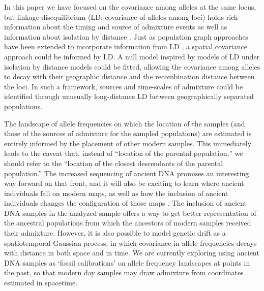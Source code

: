 \documentclass[12pt]{article}
\begin{document}
In this paper we have focused on the covariance among alleles at the same locus, 
but linkage disequilibrium (LD; covariance of alleles among loci) 
holds rich information about the timing and source of admixture events \citep[e.g.][]{chakraborty_admixture_1988,moorjani_india_2013, Hellenthal,gravel_population_2012} 
as well as information about isolation by distance \citep{ralph2013geography}.
Just as population graph approaches have been extended to incorporate information from LD \citep{Loh:13}, 
a spatial covariance approach could be informed by LD. 
A null model inspired by models of LD under isolation by distance models \citep{Arkendra2007,Barton2013} could be fitted, 
allowing the covariance among alleles to decay with their geographic distance and the recombination distance between the loci. 
In such a framework, sources and time-scales of admixture could be identified through unusually long-distance LD between geographically separated populations. 

The landscape of allele frequencies on which the location of the samples 
(and those of the sources of admixture for the sampled populations) 
are estimated is entirely informed by the placement of other modern samples.  
This immediately leads to the caveat that, instead of ``location of the parental population,''
we should refer to the ``location of the closest descendants of the parental population.''
The increased sequencing of ancient DNA \citep[see][for a recent review]{pickrell_reich:14} promises an interesting way forward on that front,
and it will also be exciting to learn where ancient individuals fall on modern maps, 
as well as how the inclusion of ancient individuals changes the configuration of those maps \citep{skoglund_investigating_2014}.
The inclusion of ancient DNA samples in the analyzed sample offers a way to get better representation of the ancestral populations from which the ancestors of modern samples received their admixture.  
However, it is also possible to model genetic drift as a spatiotemporal Gaussian process, 
in which covariance in allele frequencies decays with distance in both space and in time.  
We are currently exploring using ancient DNA samples as  `fossil calibrations' on allele frequency landscapes at points in the past, 
so that modern day samples may draw admixture from coordinates estimated in spacetime.

\newpage
\end{document}
